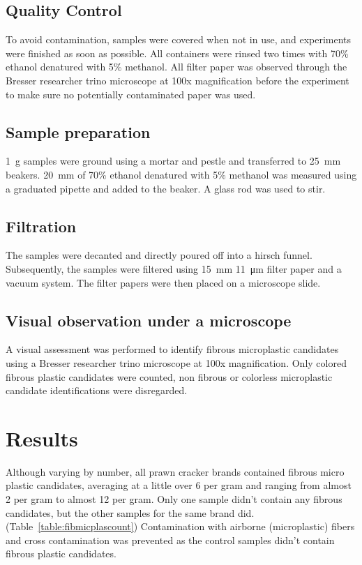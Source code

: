 \documentclass[11pt]{article}
\begin{document}
        \subsection{Quality Control}
            To avoid contamination, samples were covered when not in use, and experiments were finished as soon as possible.
            All containers were rinsed two times with 70\% ethanol denatured with 5\% methanol.
            All filter paper was observed through the Bresser researcher trino microscope at 100x magnification before the experiment to make sure no potentially contaminated paper was used.
        \subsection{Sample preparation}
            \SI{1}{\gram} samples were ground using a mortar and pestle and transferred to \SI{25}{\milli\meter} beakers.
            \SI{20}{\milli\meter} of 70\% ethanol denatured with 5\% methanol was measured using a graduated pipette and added to the beaker.
            A glass rod was used to stir.
        \subsection{Filtration}
            The samples were decanted and directly poured off into a hirsch funnel.
            Subsequently, the samples were filtered using \SI{15}{\milli\meter} \SI{11}{\micro\metre} filter paper and a vacuum system.
            The filter papers were then placed on a microscope slide.
        \subsection{Visual observation under a microscope}
            A visual assessment was performed to identify fibrous microplastic candidates using a Bresser researcher trino microscope at 100x magnification.
            Only colored fibrous plastic candidates were counted, non fibrous or colorless microplastic candidate identifications were disregarded.

    \section{Results}
        Although varying by number, all prawn cracker brands contained fibrous micro plastic candidates, averaging at a little over 6 per gram and ranging from almost 2 per gram to almost 12 per gram.
        Only one sample didn't contain any fibrous candidates, but the other samples for the same brand did. (Table~\ref{table:fibmicplascount})
        Contamination with airborne (microplastic) fibers and cross contamination was prevented as the control samples didn't contain fibrous plastic candidates.
\end{document}
